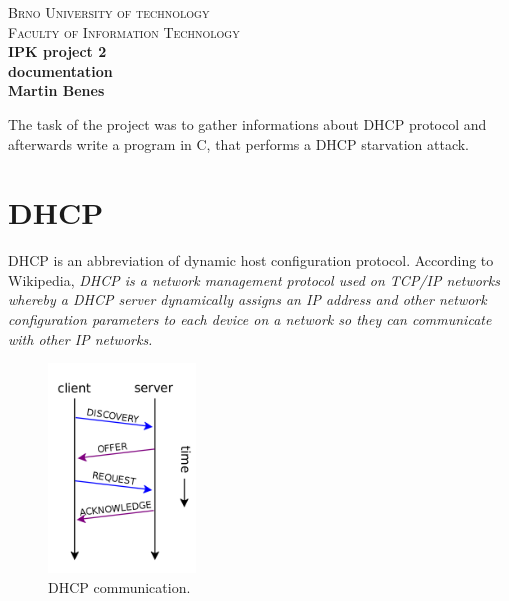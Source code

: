 \documentclass[10pt,a4paper,titlepage]{article}
\begin{document}
\begin{titlepage}

\begin{center}
\textsc{\LARGE Brno University of technology}\\[0.5cm]
\textsc{\large Faculty of Information Technology}\\[8cm]

{ \huge \bfseries IPK project 2}\\[0.3cm]
{ \Large \bfseries documentation}\\[0.5cm]
{ \bfseries Martin Benes}\\

\end{center}

\end{titlepage}
\newpage



The task of the project was to gather informations about DHCP protocol and afterwards write a program in C,
that performs a DHCP starvation attack.

\section*{DHCP}
DHCP is an abbreviation of dynamic host configuration protocol. According to Wikipedia, {\it DHCP is a network management protocol used on TCP/IP networks
whereby a DHCP server dynamically assigns an IP address and other network configuration parameters to each device on a network so they can communicate
with other IP networks. } \cite{DHCPwikipedia}

\begin{figure}
    \centering
    \includegraphics[width=0.35\textwidth]{dhcpcomm.png}
    \caption{ DHCP communication. \cite{DHCPcomm}}
    \label{fig:triangle}
\end{figure}

\printbibliography
\end{document}
